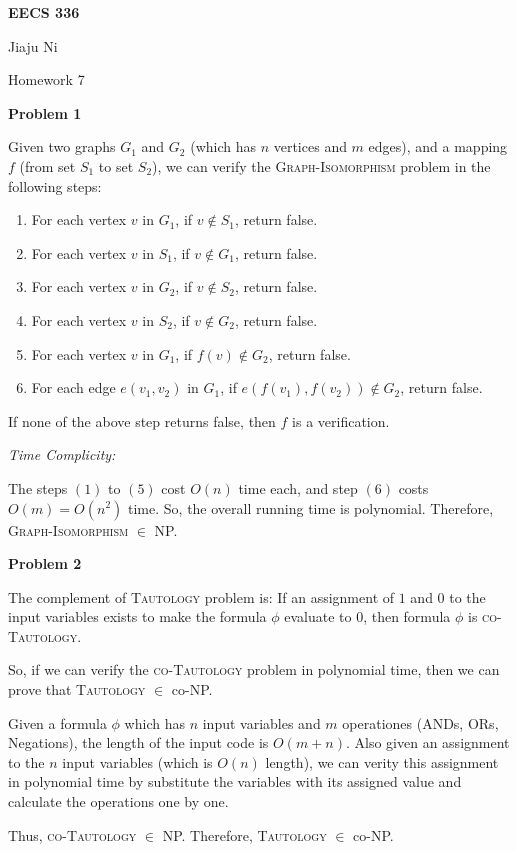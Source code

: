 \documentclass[12pt,letterpaper]{article}
\def\pp{\par\noindent}
\newcommand{\problem}[1]{ \bigskip \pp \textbf{Problem #1}\par}
\newcommand{\timecomplexity}{\medskip\pp\textit{Time Complicity:}\par}
\begin{document}
\centerline{\bf EECS 336}

\medskip
\centerline{Jiaju Ni}
\centerline{Homework 7}
\bigskip


\problem{1}
Given two graphs $G_1$ and $G_2$ (which has $n$ vertices and $m$ edges), and a mapping $f$ (from set $S_1$ to set $S_2$), we can verify the \textsc{Graph-Isomorphism} problem in the following steps:
\begin{enumerate}[itemsep=0mm]
	\item For each vertex $v$ in $G_1$, if $v\notin S_1$, return false.
	\item For each vertex $v$ in $S_1$, if $v\notin G_1$, return false.
	\item For each vertex $v$ in $G_2$, if $v\notin S_2$, return false.
	\item For each vertex $v$ in $S_2$, if $v\notin G_2$, return false.
	\item For each vertex $v$ in $G_1$, if $f(v)\notin G_2$, return false.
	\item For each edge $e(v_1,v_2)$ in $G_1$, if $e(f(v_1),f(v_2))\notin G_2$, return false.
\end{enumerate}
If none of the above step returns false, then $f$ is a verification.
\timecomplexity
The steps $(1)$ to $(5)$ cost $O(n)$ time each, and step $(6)$ costs $O(m)=O(n^2)$ time. So, the overall running time is polynomial. Therefore, \textsc{Graph-Isomorphism} $\in$ NP.

\problem{2}
The complement of \textsc{Tautology} problem is: If an assignment of $1$ and $0$ to the input variables exists to make the formula $\phi$ evaluate to 0, then formula $\phi$ is \textsc{co-Tautology}.\par
So, if we can verify the \textsc{co-Tautology} problem in polynomial time, then we can prove that \textsc{Tautology} $\in$ co-NP.\par
Given a formula $\phi$ which has $n$ input variables and $m$ operationes (ANDs, ORs, Negations), the length of the input code is $O(m+n)$. Also given an assignment to the $n$ input variables (which is $O(n)$ length), we can verity this assignment in polynomial time by substitute the variables with its assigned value and calculate the operations one by one.\par
Thus, \textsc{co-Tautology} $\in$ NP. Therefore, \textsc{Tautology} $\in$ co-NP.
\end{document}

